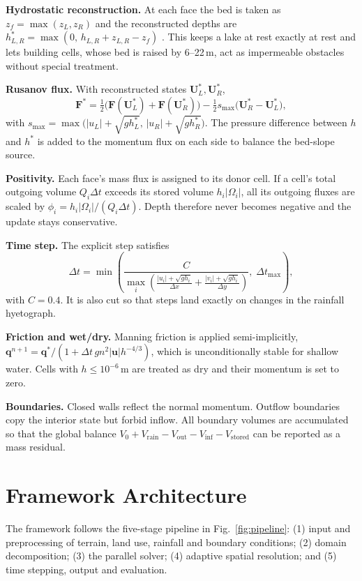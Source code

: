 \documentclass[conference]{IEEEtran}
\begin{document}
\textbf{Hydrostatic reconstruction.} At each face the bed is taken as
$z_f=\max(z_L,z_R)$ and the reconstructed depths are
$h_{L,R}^{*}=\max(0,\,h_{L,R}+z_{L,R}-z_f)$ \cite{audusse2004}. This keeps a
lake at rest exactly at rest and lets building cells, whose bed is raised by
6--22\,m, act as impermeable obstacles without special treatment.

\textbf{Rusanov flux.} With reconstructed states $\mathbf{U}_L^*,\mathbf{U}_R^*$,
\begin{equation}
\mathbf{F}^{*} = \tfrac12\big(\mathbf{F}(\mathbf{U}_L^*)+\mathbf{F}(\mathbf{U}_R^*)\big)
- \tfrac12 s_{\max}\big(\mathbf{U}_R^*-\mathbf{U}_L^*\big),
\end{equation}
with $s_{\max}=\max\big(\lvert u_L\rvert+\sqrt{g h_L^*},\,\lvert u_R\rvert+\sqrt{g h_R^*}\big)$.
The pressure difference between $h$ and $h^*$ is added to the momentum flux
on each side to balance the bed-slope source.

\textbf{Positivity.} Each face's mass flux is assigned to its donor cell. If a
cell's total outgoing volume $Q_i\Delta t$ exceeds its stored volume
$h_i\lvert\Omega_i\rvert$, all its outgoing fluxes are scaled by
$\phi_i = h_i\lvert\Omega_i\rvert/(Q_i\Delta t)$. Depth therefore never becomes
negative and the update stays conservative.

\textbf{Time step.} The explicit step satisfies
\begin{equation}
\Delta t = \min\!\left(\frac{C}{\max_i\!\left(\frac{\lvert u_i\rvert+\sqrt{gh_i}}{\Delta x}+\frac{\lvert v_i\rvert+\sqrt{gh_i}}{\Delta y}\right)},\;\Delta t_{\max}\right),
\end{equation}
with $C=0.4$. It is also cut so that steps land exactly on changes in the
rainfall hyetograph.

\textbf{Friction and wet/dry.} Manning friction is applied semi-implicitly,
$\mathbf{q}^{n+1} = \mathbf{q}^{*}/(1+\Delta t\, g n^2 \lvert\mathbf{u}\rvert h^{-4/3})$,
which is unconditionally stable for shallow water. Cells with
$h\le 10^{-6}$\,m are treated as dry and their momentum is set to zero.

\textbf{Boundaries.} Closed walls reflect the normal momentum. Outflow
boundaries copy the interior state but forbid inflow. All boundary volumes are
accumulated so that the global balance
$V_0 + V_{\text{rain}} - V_{\text{out}} - V_{\text{inf}} - V_{\text{stored}}$
can be reported as a mass residual.

\section{Framework Architecture}
The framework follows the five-stage pipeline in Fig.~\ref{fig:pipeline}:
(1) input and preprocessing of terrain, land use, rainfall and boundary
conditions; (2) domain decomposition; (3) the parallel solver; (4) adaptive
spatial resolution; and (5) time stepping, output and evaluation.
\end{document}
